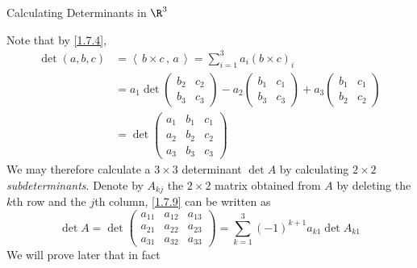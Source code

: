 \documentclass[smaller,hyperref={CJKbookmarks=true}]{beamer}
\newcommand{\scp}[2]{\left\langle\,#1\,,\,#2\,\right\rangle} \newcommand{\scpp}{\langle\,\cdot\,,\,\cdot\,\rangle}
\begin{document}
\begin{frame}{Calculating Determinants in $\R^3$}
\begin{spacing}{1}
Note that by \eqref{1.7.4},
\vspace*{-7pt}
\begin{equation}\label{1.7.9}
  \begin{split}
     \det(a,b,c) &=\scp{b\times c}{a}=\sum_{i=1}^{3}a_i(b\times c)_i \\
       &=a_1\det\begin{pmatrix}
                  b_2 & c_2 \\
                  b_3 & c_3
                \end{pmatrix}-a_2\begin{pmatrix}
                                   b_1 &c_1 \\
                                    b_3& c_3
                                 \end{pmatrix}+a_3\begin{pmatrix}
                                                    b_1 &c_1 \\
                                                    b_2 & c_2
                                                  \end{pmatrix}  \\
       &=\det\begin{pmatrix}
               a_1 & b_1 & c_1 \\
               a_2 & b_2 & c_2 \\
               a_3 & b_3 & c_3
             \end{pmatrix}
  \end{split}
\end{equation}
We may therefore calculate a $3\times 3$ determinant $\det A$ by calculating $2\times 2$
\emph{subdeterminants}. Denote by $A_{kj}$ the $2\times 2$ matrix obtained from $A$ by
deleting the $k$th row and the $j$th column, \eqref{1.7.9} can be written as
\begin{equation}\label{1.7.10}
  \det A=\det\begin{pmatrix}
               a_{11} & a_{12} & a_{13} \\
               a_{21} & a_{22} & a_{23} \\
               a_{31} & a_{32} & a_{33}
             \end{pmatrix}=\sum_{k=1}^{3}(-1)^{k+1}a_{k1}\det A_{k1}
\end{equation}
\newpage
We will prove later that in fact

\end{spacing}
\end{frame}
\end{document}
